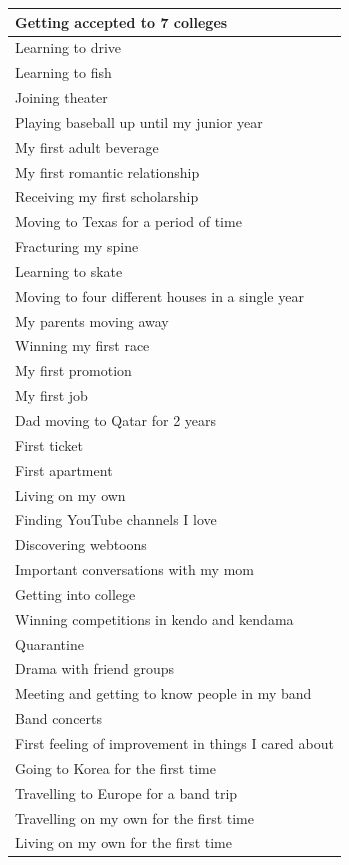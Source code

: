 \documentclass[
  .7em,
  letterpaper,
  DIV=11,
  numbers=noendperiod]{scrartcl}
\begin{document}
\begin{table}
\begin{tabular}{l}
\hline
Getting accepted to 7 colleges\\
\hline
Learning to drive\\
\hline
Learning to fish\\
\hline
Joining theater\\
\hline
Playing baseball up until my junior year\\
\hline
My first adult beverage\\
\hline
My first romantic relationship\\
\hline
Receiving my first scholarship\\
\hline
Moving to Texas for a period of time\\
\hline
Fracturing my spine\\
\hline
Learning to skate\\
\hline
Moving to four different houses in a single year\\
\hline
My parents moving away\\
\hline
Winning my first race\\
\hline
My first promotion\\
\hline
My first job\\
\hline
Dad moving to Qatar for 2 years\\
\hline
First ticket\\
\hline
First apartment\\
\hline
Living on my own\\
\hline
Finding YouTube channels I love\\
\hline
Discovering webtoons\\
\hline
Important conversations with my mom\\
\hline
Getting into college\\
\hline
Winning competitions in kendo and kendama\\
\hline
Quarantine\\
\hline
Drama with friend groups\\
\hline
Meeting and getting to know people in my band\\
\hline
Band concerts\\
\hline
First feeling of improvement in things I cared about\\
\hline
Going to Korea for the first time\\
\hline
Travelling to Europe for a band trip\\
\hline
Travelling on my own for the first time\\
\hline
Living on my own for the first time\\

\end{tabular}
\end{table}
\end{document}
